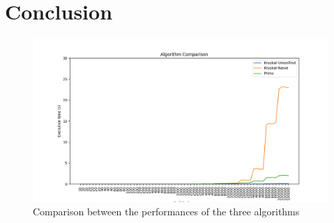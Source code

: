 \section{Conclusion}

\begin{figure}[H]
	\hspace{-1cm}\includegraphics[width=19cm]{Img/AlgorithmComparison_Graph.png}
	\caption{Comparison between the performances of the three algorithms }
	\label{comparison}
\end{figure}

\pagebreak
